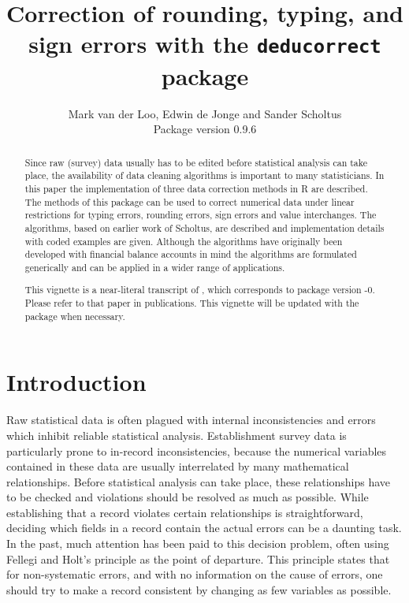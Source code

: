 \documentclass[11pt, fleqn, a4paper]{article}
\title{Correction of rounding, typing, and sign errors with the {\tt deducorrect} package}
\author{Mark van der Loo, Edwin de Jonge and Sander Scholtus\\
{\small Package version 0.9.6}}
\begin{document}
\maketitle
\begin{abstract}

Since raw (survey) data usually has to be edited before statistical analysis
can take place, the availability of data cleaning algorithms is important to
many statisticians.  In this paper the implementation of three data correction
methods in R are described. The methods of this package can be used to correct
numerical data under linear restrictions for typing errors, rounding errors,
sign errors and value interchanges. The algorithms, based on earlier work of
Scholtus, are described and implementation details with coded examples are given.
Although the algorithms have originally been developed with financial balance
accounts in mind the algorithms are formulated generically and can be applied
in a wider range of applications.

This vignette is a near-literal transcript of \cite{loo:2011a}, which corresponds to
package version {-0}. Please refer to that paper in publications. 
This vignette will be updated with the package when necessary.

\end{abstract}

\maketitle

\newpage

\tableofcontents
\listofalgorithms
\newpage
\section{Introduction}
Raw statistical data  is often plagued with internal inconsistencies and errors
which inhibit reliable statistical analysis. Establishment survey data is
particularly prone to in-record inconsistencies, because the numerical
variables contained in these data are usually interrelated by many mathematical
relationships. Before statistical analysis can take place, these relationships
have to be checked and violations should be resolved as much as possible.
While establishing that a record violates certain relationships is
straightforward, deciding which fields in a record contain the actual errors
can be a daunting task. In the past, much attention has been paid to this
decision problem, often using Fellegi and Holt's principle \citep{fellegi:1976}
as the point of departure. This principle states that for non-systematic errors, and
with no information on the cause of errors, one should try to make a record
consistent by changing as few variables as possible.
\end{document}
